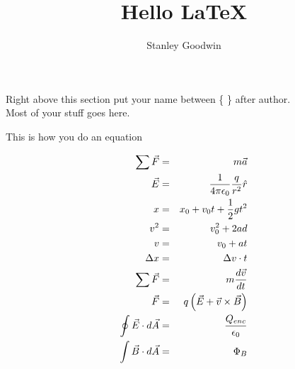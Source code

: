 \documentclass{article}
\author{Stanley Goodwin} \title {Hello \LaTeX}
\begin{document}
\maketitle
Right above this section put your name between \{ \} after author.\\


Most of your  stuff goes here. 

This is how you do an equation

\begin{eqnarray}
    \sum \vec{F} &=& m \vec{a} \\
    \vec{E} &=& {1 \over {4 \pi \epsilon_0}} {q \over {r^2}} \hat{r} \\
    x &=& x_0 + v_0 t + \dfrac{1}{2} g t^2 \\
    v^2 &=& v_0^2 + 2ad \\
    v &=& v_0 + at \\
    \Delta x &=& \Delta v \cdot t \\
    \sum \vec{F} &=& m \dfrac{d \vec{v}}{d t} \\
    \vec{F} &=& q \left( \vec{E} + \vec{v} \times \vec{B} \right) \\
    \oint \vec{E} \cdot d\vec{A} &=& \dfrac{Q_{enc}}{\epsilon_0} \\
    \int \vec{B} \cdot d\vec{A} &=& \Phi_B
\end{eqnarray}
\end{document}
